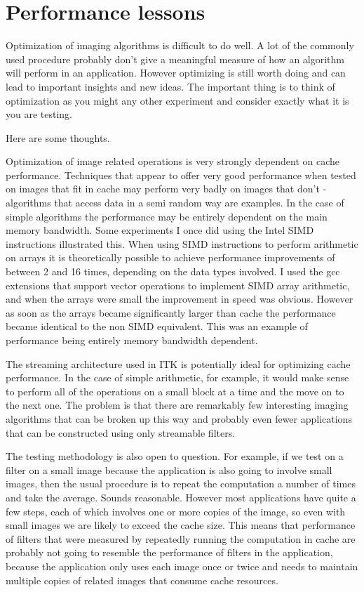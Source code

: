 \documentclass[IJ]{cesj}
\begin{document}
\section{Performance lessons}
\label{sect:performance_lessons}
Optimization of imaging algorithms is difficult to do well. A lot of
the commonly used procedure probably don't give a meaningful measure
of how an algorithm will perform in an application. However optimizing
is still worth doing and can lead to important insights and new
ideas. The important thing is to think of optimization as you might
any other experiment and consider exactly what it is you are testing.

Here are some thoughts.

Optimization of image related operations is very strongly dependent on
cache performance. Techniques that appear to offer very good
performance when tested on images that fit in cache may perform very
badly on images that don't - algorithms that access data in a semi
random way are examples. In the case of simple algorithms the
performance may be entirely dependent on the main memory
bandwidth. Some experiments I once did using the Intel SIMD
instructions illustrated this. When using SIMD instructions to perform
arithmetic on arrays it is theoretically possible to achieve
performance improvements of between 2 and 16 times, depending on the
data types involved. I used the gcc extensions that support vector
operations to implement SIMD array arithmetic, and when the arrays
were small the improvement in speed was obvious. However as soon as
the arrays became significantly larger than cache the performance
became identical to the non SIMD equivalent. This was an example of
performance being entirely memory bandwidth dependent.

The streaming architecture used in ITK is potentially ideal for
optimizing cache performance. In the case of simple arithmetic, for
example, it would make sense to perform all of the operations on a
small block at a time and the move on to the next one. The problem is
that there are remarkably few interesting imaging algorithms that can
be broken up this way and probably even fewer applications that can be
constructed using only streamable filters.

The testing methodology is also open to question. For example, if we
test on a filter on a small image because the application is also
going to involve small images, then the usual procedure is to repeat
the computation a number of times and take the average. Sounds
reasonable. However most applications have quite a few steps, each of
which involves one or more copies of the image, so even with small
images we are likely to exceed the cache size. This means that
performance of filters that were measured by repeatedly running the
computation in cache are probably not going to resemble the
performance of filters in the application, because the application
only uses each image once or twice and needs to maintain multiple
copies of related images that consume cache resources.
\end{document}
